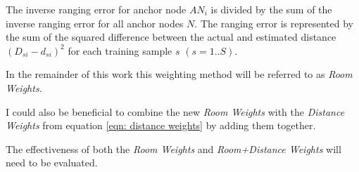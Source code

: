The inverse ranging error for anchor node $AN_i$ is divided by the sum of the inverse ranging error for all anchor nodes $N$. The ranging error is represented by the sum of the squared difference between the actual and estimated distance $(D_{si}-d_{si})^2$ for each training sample $s$ $(s=1..S)$.

In the remainder of this work this weighting method will be referred to as \emph{Room Weights}.

I could also be beneficial to combine the new \emph{Room Weights} with the \emph{Distance Weights} from equation \ref{eqn: distance weights} by adding them together.


The effectiveness of both the \emph{Room Weights} and \emph{Room+Distance Weights} will need to be evaluated.